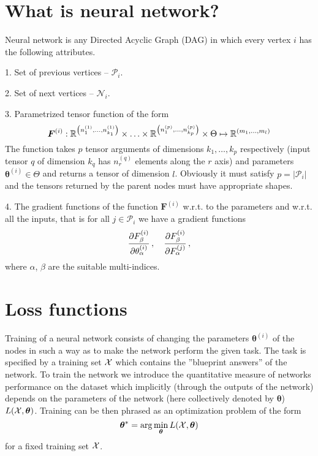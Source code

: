 \documentclass{myclass}
\begin{document}
\section{What is neural network?}

Neural network is any Directed Acyclic Graph (DAG) in which every vertex \(i\) has the following attributes.

\medskip

1. Set of previous vertices -- \(\mathscr{P}_i\).

\medskip

2. Set of next vertices -- \(\mathscr{N}_i\).

\medskip

3. Parametrized tensor function of the form
\[
   \bm{F}^{(i)} : \mathbb{R}^{\left(n_{1}^{(1)}, \ldots, n_{k_1}^{(1)}\right)} \times \ldots \times  \mathbb{R}^{\left(n_{1}^{(p)}, \ldots, n_{k_p}^{(p)}\right)} \times \Theta \mapsto \mathbb{R}^{(m_1, \ldots, m_l)}
\]
The function takes \(p\) tensor arguments of dimensions \(k_1,\ldots,k_p\) respectively (input tensor \(q\) of dimension \(k_q\) has \(n_{r}^{(q)}\) elements along the \(r\) axis) and parameters \(\bm{\theta}^{(i)} \in \Theta\) and returns a tensor of dimension \(l\). Obviously it must satisfy \(p = |\mathscr{P}_i|\) and the tensors returned by the parent nodes must have appropriate shapes.

\medskip

4. The gradient functions of the function \(\bm{F}^{(i)}\) w.r.t. to the parameters and w.r.t. all the inputs, that is for all \(j \in \mathscr{P}_i\) we have a gradient functions
\[
   \pdv{F_\beta ^{(i)}}{\theta_\alpha ^{(i)}}\,,\quad \pdv{F_\beta ^{(i)}}{F_\alpha ^{(j)}} \,,
\]
where \(\alpha\), \(\beta\) are the suitable multi-indices.


\section{Loss functions}

Training of a neural network consists of changing the parameters \(\bm{\theta}^{(i)}\) of the nodes in such a way as to make the network perform the given task. The task is specified by a training set \(\mathcal{X}\) which contains the ''blueprint answers'' of the network. To train the network we introduce the quantitative measure of networks performance on the dataset which implicitly (through the outputs of the network) depends on the parameters of the network (here collectively denoted by \(\bm{\theta}\)) \(L(\mathcal{X}, \bm{\theta})\). Training can be then phrased as an optimization problem of the form
\[
   \bm{\theta}^* = \arg \min_{\bm{\theta}} L(\mathcal{X}, \bm{\theta})
\]
for a fixed training set \(\mathcal{X}\).
\end{document}
